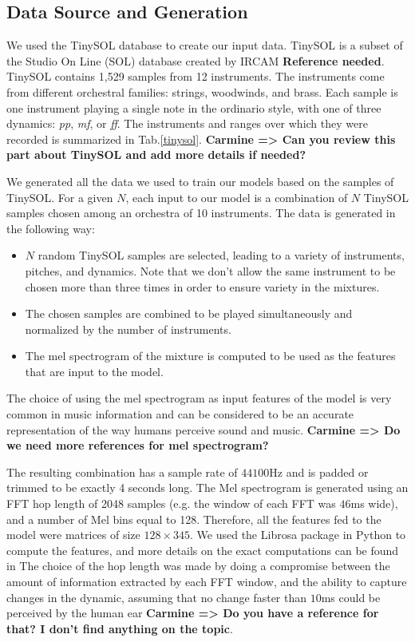 \documentclass{article}
\newcommand{\carmine}[1]{\textbf{\color{red} Carmine => #1}}
\begin{document}
\subsection{Data Source and Generation}

We used the TinySOL database to create our input data. TinySOL is a subset of the Studio On Line (SOL) database created by IRCAM \textbf{Reference needed}. TinySOL contains 1,529 samples from 12 instruments. The instruments come from different orchestral families: strings, woodwinds, and brass. Each sample is one instrument playing a single note in the ordinario style, with one of three dynamics: \textit{pp}, \textit{mf}, or \textit{ff}. The instruments and ranges over which they were recorded is summarized in Tab.\ref{tinysol}.  \carmine{Can you review this part about TinySOL and add more details if needed?}

We generated all the data we used to train our models based on the samples of TinySOL. For a given $N$, each input to our model is a combination of $N$ TinySOL samples chosen among an orchestra of 10 instruments. The data is generated in the following way: 

\begin{itemize}
\item $N$ random TinySOL samples are selected, leading to a variety of instruments, pitches, and dynamics. Note that we don't allow the same instrument to be chosen more than three times in order to ensure variety in the mixtures.
\item The chosen samples are combined to be played simultaneously and normalized by the number of instruments.
\item The mel spectrogram of the mixture is computed to be used as the features that are input to the model.
\end{itemize}

The choice of using the mel spectrogram as input features of the model is very common in music information \cite{Stevens37} and can be considered to be an accurate representation of the way humans perceive sound and music.\carmine{Do we need more references for mel spectrogram?}

The resulting combination has a sample rate of $44100$Hz and is padded or trimmed to be exactly 4 seconds long. The Mel spectrogram is generated using an FFT hop length of 2048 samples (e.g. the window of each FFT was $46$ms wide), and a number of Mel bins equal to 128. Therefore, all the features fed to the model were matrices of size $128\times 345$. We used the Librosa package in Python to compute the features, and more details on the exact computations can be found in \cite{mcfee15} The choice of the hop length was made by doing a compromise between the amount of information extracted by each FFT window, and the ability to capture changes in the dynamic, assuming that no change faster than $10$ms could be perceived by the human ear \carmine{Do you have a reference for that? I don't find anything on the topic}.
\end{document}
